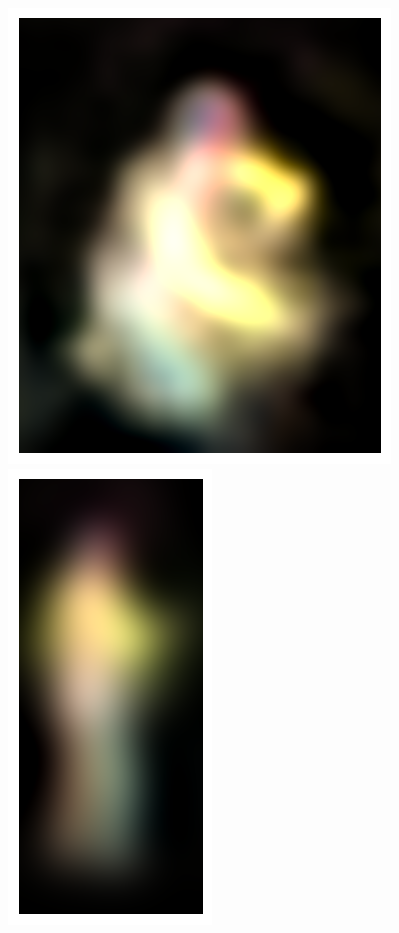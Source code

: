 \begin{figure}[t!]
    \includegraphics[height=\flowhh]{resources/Human_Poses/qualitative/svs-4}
    \hfill
    \includegraphics[height=\flowhh]{resources/Human_Poses/qualitative/svs-5}
    \hfill

\end{figure}
